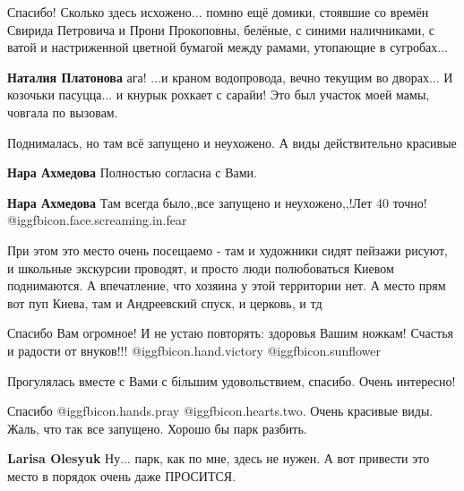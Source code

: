 \begin{itemize}
\begin{itemize}
\end{itemize} %


Спасибо! Сколько здесь исхожено... помню ещё домики, стоявшие со времён Свирида
Петровича и Прони Прокоповны, белёные, с синими наличниками, с ватой и
настриженной цветной бумагой между рамами, утопающие в сугробах...

\begin{itemize} %
\textbf{Наталия Платонова} ага!
...и краном водопровода, вечно текущим во дворах...
И козочьки пасуцца... и кнурык рохкает с сарайи!
Это был участок моей мамы, човгала по вызовам.
\end{itemize} %


Поднималась, но там всё запущено и неухожено. А виды действительно красивые

\begin{itemize} %
\textbf{Нара Ахмедова} Полностью согласна с Вами.

\textbf{Нара Ахмедова} Там всегда было,,все запущено и неухожено,,!Лет 40 точно! @igg{fbicon.face.screaming.in.fear} 


При этом это место очень посещаемо - там и художники сидят пейзажи рисуют, и
школьные экскурсии проводят, и просто люди полюбоваться Киевом поднимаются. А
впечатление, что хозяина у этой территории нет. А место прям вот пуп Киева, там
и Андреевский спуск, и церковь, и тд

\end{itemize} %


Спасибо Вам огромное! И не устаю повторять: здоровья Вашим ножкам! Счастья и
радости от внуков!!! @igg{fbicon.hand.victory} @igg{fbicon.sunflower} 


Прогулялась вместе с Вами с більшим удовольствием, спасибо. Очень интересно!

Спасибо @igg{fbicon.hands.pray}  @igg{fbicon.hearts.two}. 
Очень красивые виды. Жаль, что так все запущено. Хорошо бы парк разбить.

\begin{itemize} %
\textbf{Larisa Olesyuk} Ну... парк, как по мне, здесь не нужен.
А вот привести это место в порядок очень даже ПРОСИТСЯ.


\end{itemize}
\end{itemize}

